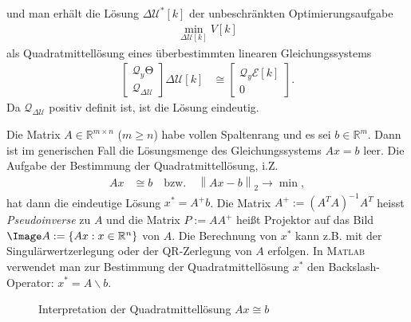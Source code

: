 und man erhält die Lösung $\Delta\mathcal{U}^{\ast}[k]$ der unbeschränkten Optimierungsaufgabe
\begin{align}
	\min\limits_{\Delta\mathcal{U}[k]}V[k]
\end{align}
als Quadratmittellösung eines überbestimmten linearen Gleichungssystems
\begin{align}
	\begin{bmatrix}
	\mathcal{Q}_y\mathrm{\Theta}\\ \mathcal{Q}_{\Delta\mathcal{U}}
	\end{bmatrix}\Delta\mathcal{U}[k] & \cong \begin{bmatrix}
	\mathcal{Q}_y\mathcal{E}[k]\\ 0
	\end{bmatrix}. \label{eqn:kap_4_quadratmittelproblem}
\end{align}
Da $\mathcal{Q}_{\Delta\mathcal{U}}$ positiv definit ist, ist die Lösung eindeutig.
\begin{remark}
Die Matrix $A\in\mathbb{R}^{m\times n}$ ($m\ge n$) habe vollen Spaltenrang und es sei $b\in\mathbb{R}^m$. Dann ist im generischen Fall die
Lösungsmenge des Gleichungssystems $A x= b$ leer. Die Aufgabe der Bestimmung der Quadratmittellösung, i.Z.
\begin{align}
	A x & \cong b\quad \text{bzw.}\quad \left\| A x -b \right\|_2\rightarrow \min,
\end{align}
hat dann die eindeutige Lösung $x^{\ast}=A^+b$. Die Matrix $A^+:=\left(A^TA\right)^{-1}A^T$ heisst \textit{Pseudoinverse} zu $A$ und die Matrix $P:=A A^+$ heißt Projektor auf das Bild
$\Image A:=\left\{ A x : x\in\mathbb{R}^n \right\}$ von $A$. Die Berechnung von $x^{\ast}$ kann z.B. mit der Singulärwertzerlegung oder der
QR-Zerlegung von $A$ erfolgen. In \textsc{Matlab} verwendet man zur Bestimmung der Quadratmittellösung $x^{\ast}$ den Backslash-Operator: $x^{\ast}=A\backslash b$.
\end{remark} 
\begin{figure}[htb]
	\centering
	
	\caption{Interpretation der Quadratmittellösung $A x\cong b$}
	\label{fig:kap_4_interp_quadratmittelloesung}
\end{figure}
